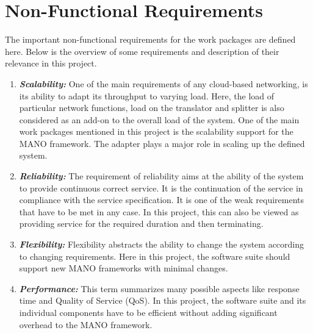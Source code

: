 \chapter{Non-Functional Requirements}
\label{ch:Non-Functional Requirements}

The important non-functional requirements for the work packages are defined here. Below is the overview of some requirements and description of their relevance in this project.


\begin{enumerate}
	\item \textit {\textbf{Scalability:}} One of the main requirements of any cloud-based networking, is its ability to adapt its throughput to varying load. Here, the load of particular network functions, load on the translator and splitter is also considered as an add-on to the overall load of the system. One of the main work packages mentioned in this project is the scalability support for the MANO framework. The adapter plays a major role in scaling up the defined system.
	
	\item \textit {\textbf{Reliability:}} The requirement of reliability aims at the ability of the system to provide continuous correct service. It is the continuation of the service in compliance with the service specification. It is one of the weak requirements that have to be met in any case. In this project, this can also be viewed as providing service for the required duration and then terminating.
		
	\item \textit{\textbf{Flexibility:}} Flexibility abstracts the ability to change the system according to changing requirements. Here in this project, the software suite should support new MANO frameworks with minimal changes.
	
	\item \textit{\textbf{Performance:}} This term summarizes many possible aspects like response time and Quality of Service (QoS). In this project, the software suite and its individual components have to be efficient without adding significant overhead to the MANO framework.
\end{enumerate}

